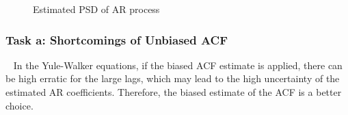 \documentclass[10pt]{article}
\begin{document}
\begin{figure}[htbp]
    \centering
    \caption{Estimated PSD of AR process}
    \label{fig8}
\end{figure}

\subsubsection{Task a: Shortcomings of Unbiased ACF}
\ \indent
In the Yule-Walker equations, if the biased ACF estimate is applied, 
there can be high erratic for the large lags, which may lead to the high 
uncertainty of the estimated AR coefficients. Therefore, the biased 
estimate of the ACF is a better choice.
\end{document}

